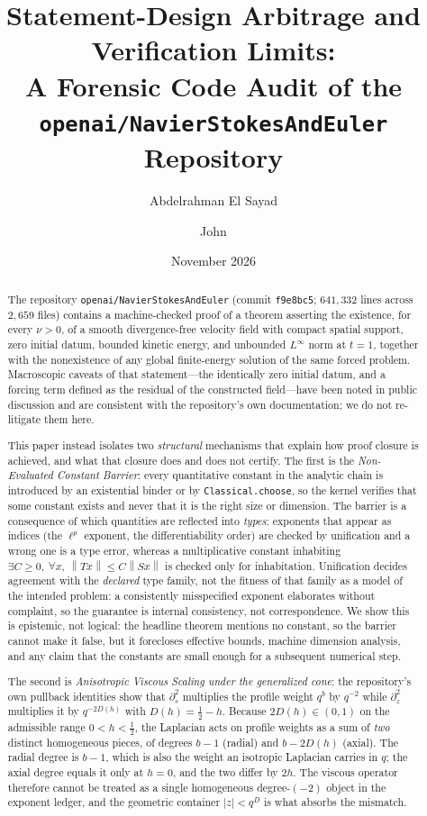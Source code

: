 \documentclass[11pt]{article}
\title{\bfseries Statement-Design Arbitrage and Verification Limits:\\
A Forensic Code Audit of the \texttt{openai/NavierStokesAndEuler} Repository}
\author{Abdelrahman El Sayad \and John}
\date{November 2026}
\newcommand{\norm}[1]{\left\lVert #1\right\rVert}
\newcommand{\ct}[1]{\texttt{#1}}
\theoremstyle{plain}
\theoremstyle{definition}
\theoremstyle{remark}
\begin{document}
\maketitle

\begin{abstract}
The repository \texttt{openai/NavierStokesAndEuler} (commit \texttt{f9e8bc5};
$641{,}332$ lines across $2{,}659$ files) contains a machine-checked proof of a
theorem asserting the existence, for every $\nu>0$, of a smooth divergence-free
velocity field with compact spatial support, zero initial datum, bounded kinetic
energy, and unbounded $L^\infty$ norm at $t=1$, together with the nonexistence
of any global finite-energy solution of the same forced problem. Macroscopic
caveats of that statement---the identically zero initial datum, and a forcing
term defined as the residual of the constructed field---have been noted in
public discussion and are consistent with the repository's own documentation;
we do not re-litigate them here.

This paper instead isolates two \emph{structural} mechanisms that explain how
proof closure is achieved, and what that closure does and does not certify.
The first is the \emph{Non-Evaluated Constant Barrier}: every quantitative
constant in the analytic chain is introduced by an existential binder or by
\ct{Classical.choose}, so the kernel verifies that some constant exists and
never that it is the right size or dimension. The barrier is a consequence of
which quantities are reflected into \emph{types}: exponents that appear as
indices (the $\ell^p$ exponent, the differentiability order) are checked by
unification and a wrong one is a type error, whereas a multiplicative constant
inhabiting $\exists C\ge 0,\ \forall x,\ \norm{Tx}\le C\norm{Sx}$ is checked
only for inhabitation. Unification decides agreement with the \emph{declared}
type family, not the fitness of that family as a model of the intended problem:
a consistently misspecified exponent elaborates without complaint, so the
guarantee is internal consistency, not correspondence. We show this is
epistemic, not logical: the headline
theorem mentions no constant, so the barrier cannot make it false, but it
forecloses effective bounds, machine dimension analysis, and any claim that the
constants are small enough for a subsequent numerical step.

The second is \emph{Anisotropic Viscous Scaling under the generalized cone}:
the repository's own pullback identities show that $\partial_s^2$ multiplies the
profile weight $q^{b}$ by $q^{-2}$ while $\partial_z^2$ multiplies it by
$q^{-2D(h)}$ with $D(h)=\tfrac12-h$. Because $2D(h)\in(0,1)$ on the admissible
range $0<h<\tfrac12$, the Laplacian acts on profile weights as a sum of
\emph{two} distinct homogeneous pieces, of degrees $b-1$ (radial) and
$b-2D(h)$ (axial). The radial degree is $b-1$, which is also the weight an
isotropic Laplacian carries in $q$; the axial degree equals it only at $h=0$,
and the two differ by $2h$.
The viscous operator therefore cannot be treated as a single homogeneous
degree-$(-2)$ object in the exponent ledger, and the geometric container
$|z|<q^{D}$ is what absorbs the mismatch.


\end{abstract}
\end{document}
